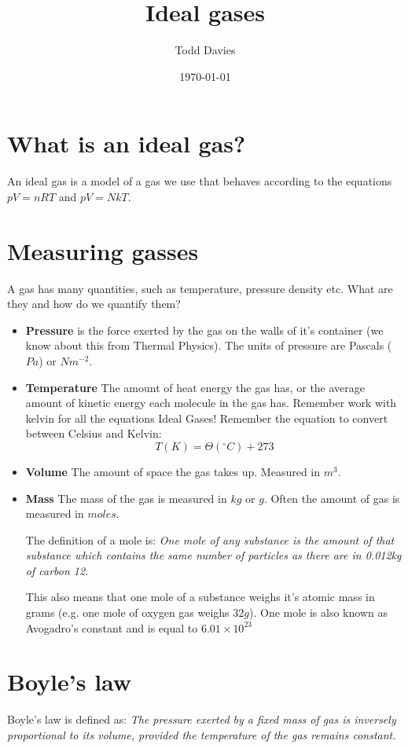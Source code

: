 \documentclass{article}
\title{Ideal gases}
\author{Todd Davies}
\date{\today}
\begin{document}
\lhead{\today}

\maketitle

\section*{What is an ideal gas?}
\thispagestyle{empty}
An ideal gas is a model of a gas we use that behaves according to the equations $pV = nRT$ and $pV = NkT$.

\section*{Measuring gasses}
A gas has many quantities, such as temperature, pressure density etc. What are they and how do we quantify them?

\begin{itemize}
	\item \textbf{Pressure} is the force exerted by the gas on the walls of it's container (we know about this from Thermal Physics). The units of pressure are Pascals ($Pa$) or $Nm^{-2}$.
	\item \textbf{Temperature} The amount of heat energy the gas has, or the average amount of kinetic energy each molecule in the gas has. Remember work with kelvin for all the equations Ideal Gases! Remember the equation to convert between Celsius and Kelvin: 
	\[
		T(K) = \Theta(^\circ C) + 273
	\]
	\item \textbf{Volume} The amount of space the gas takes up. Measured in $m^3$.
	\item \textbf{Mass} The mass of the gas is measured in $kg$ or $g$. Often the amount of gas is measured in $moles$.
	
	The definition of a mole is: \textit{One mole of any substance is the amount of that substance which contains the same number of particles as there are in 0.012kg of carbon 12.}
	
	This also means that one mole of a substance weighs it's atomic mass in grams (e.g. one mole of oxygen gas weighs $32g$). One mole is also known as Avogadro's constant and is equal to $6.01 \times 10^{23}$
\end{itemize}

\section*{Boyle's law}
Boyle's law is defined as: \textit{The pressure exerted by a fixed mass of gas is inversely proportional to its volume, provided the temperature of the gas remains constant.}
\end{document}
